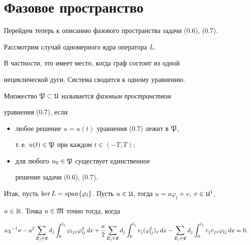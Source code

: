\section{Фазовое пространство}





Перейдем теперь к описанию фазового пространства задачи (0.6), (0.7).


Рассмотрим случай одномерного ядра оператора $L$.


В частности, это имеет место, когда граф состоит из одной


нециклической дуги. Система сводится к одному уравнению.








\begin{defns}


Множество $\frak{P}\subset \frak{U}$ называется {\it фазовым пространством}


уравнения (0.7), если


\begin{itemize}


\item[(i)] любое решение $u=u(t)$ уравнения (0.7) лежит в $\frak{P}$,


т.\,е. $u(t) \in \frak{P}$ при каждом $t \in (-T,T)$;


\item[(ii)] для любого $u_0 \in \frak{P}$ существует единственное 


решение задачи (0.6), (0.7).


\end{itemize}


\end{defns}





Итак, пусть $\ker{L}=\Span\{\varphi_l\}$. Пусть $u \in


\frak{U}$, тогда $u=a \varphi_l+v$, $v \in \frak{U}^1$,


$a \in \Bbb{R}$. Точка $u \in \frak{M}$ точно тогда, когда


\begin{equation}


a \chi^{-1} \nu-a^2 \sum_{E_j \in \frak{E}}d_j


\int_0^{l_j} \varphi_{ljx} \varphi^2_{lj} \,dx+\frac{a}{2}


\sum_{E_j \in \frak{E}}d_j \int_0^{l_j} v_j


(\varphi^2_{lj})_x \,dx-\sum_{E_j \in \frak{E}}d_j


\int_0^{l_j}v_j v_{jx} \varphi_{lj} \,dx=0.


\end{equation}


